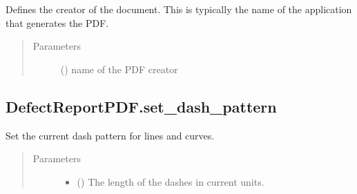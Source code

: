 \documentclass[letterpaper,10pt,english]{sphinxmanual}
\begin{document}
\begin{fulllineitems}
\begin{fulllineitems}
\label{\detokenize{generated/quality_assessment.quality_pdf_report.DefectReportPDF.set_creator:quality_assessment.quality_pdf_report.DefectReportPDF.set_creator}}
\sphinxAtStartPar
Defines the creator of the document.
This is typically the name of the application that generates the PDF.
\begin{quote}\begin{description}
\item[{Parameters}] \leavevmode
\sphinxAtStartPar
{} () \textendash{} name of the PDF creator

\end{description}\end{quote}

\end{fulllineitems}



\subsection{DefectReportPDF.set\_dash\_pattern}
\label{\detokenize{generated/quality_assessment.quality_pdf_report.DefectReportPDF.set_dash_pattern:defectreportpdf-set-dash-pattern}}\label{\detokenize{generated/quality_assessment.quality_pdf_report.DefectReportPDF.set_dash_pattern::doc}}

\begin{fulllineitems}
\label{\detokenize{generated/quality_assessment.quality_pdf_report.DefectReportPDF.set_dash_pattern:quality_assessment.quality_pdf_report.DefectReportPDF.set_dash_pattern}}
\sphinxAtStartPar
Set the current dash pattern for lines and curves.
\begin{quote}\begin{description}
\item[{Parameters}] \leavevmode\begin{itemize}
\item {} 
\sphinxAtStartPar
{} () \textendash{} The length of the dashes in current units.


\end{itemize}
\end{description}
\end{quote}
\end{fulllineitems}
\end{fulllineitems}
\end{document}
